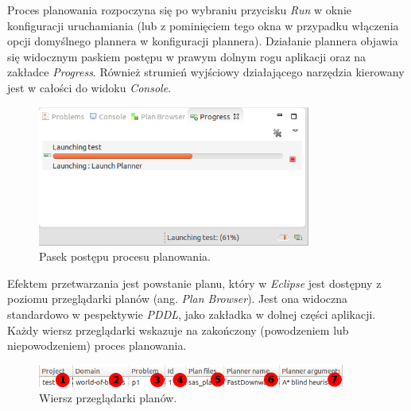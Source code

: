 Proces planowania rozpoczyna się po wybraniu przycisku \textit{Run} w oknie konfiguracji uruchamiania (lub z pominięciem tego okna w przypadku włączenia opcji domyślnego plannera w konfiguracji plannera). Działanie plannera objawia się widocznym paskiem postępu w prawym dolnym rogu aplikacji oraz na zakładce \textit{Progress}. Również strumień wyjściowy działającego narzędzia kierowany jest w całości do widoku \textit{Console}.

\newpage
\begin{figure}[h!]
    \centering
    \includegraphics[width=0.8\textwidth]{img/run_progress}
    \caption{Pasek postępu procesu planowania.}
    \label{fig:run_progress}
\end{figure}

Efektem przetwarzania jest powstanie planu, który w \textit{Eclipse} jest dostępny z poziomu przeglądarki planów (ang. \textit{Plan Browser}). Jest ona widoczna standardowo w pespektywie \textit{PDDL}, jako zakładka w dolnej części aplikacji. Każdy wiersz przeglądarki wskazuje na zakończony (powodzeniem lub niepowodzeniem) proces planowania. 

\begin{figure}[h!]
    \centering
    \includegraphics[width=0.9\textwidth]{img/plan_browser_row}
    \caption{Wiersz przeglądarki planów.}
    \label{fig:plan_browser_row}
\end{figure}

